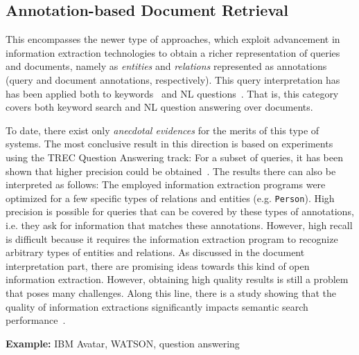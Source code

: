 \subsection{Annotation-based Document Retrieval} This encompasses the newer type of approaches, which exploit advancement in information extraction technologies to obtain a richer representation of queries and documents, namely as \emph{entities} and \emph{relations} represented as annotations (query and document annotations, respectively). This query interpretation has has been applied both to keywords~\cite{} and NL questions~\cite{}. That is, this category covers both keyword search and NL question answering over documents. 

To date, there exist only \emph{anecdotal evidences} for the merits of this type of systems. 
The most conclusive result in this direction is based on experiments using the TREC Question Answering track: For a subset of queries, it has been shown that higher precision could be obtained~\cite{DBLP:conf/sigir/Chu-CarrollPCFD06}. The results there can also be interpreted as follows: The employed information extraction programs were optimized for a few specific types of relations and entities (e.g. \verb+Person+). High precision is possible for queries that can be covered by these types of annotations, i.e. they ask for information that matches these annotations. However, high recall is difficult because it requires the information extraction program to recognize arbitrary types of entities and relations. As discussed in the document interpretation part, there are promising ideas towards this kind of open information extraction. However, obtaining high quality results is still a problem that poses many challenges. Along this line, there is a study showing that the quality of information extractions significantly impacts semantic search performance~\cite{DBLP:conf/cikm/Chu-CarrollP07}. 

\textbf{Example:}
IBM Avatar, WATSON, question answering ~\cite{DBLP:conf/sigir/Chu-CarrollPCFD06} 


